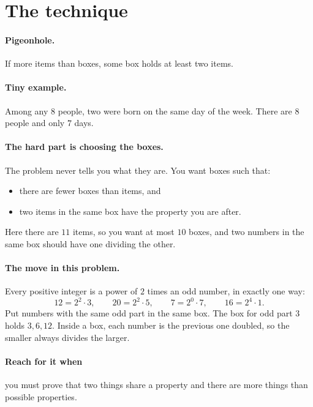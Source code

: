 \documentclass[11pt]{article}
\begin{document}

\section*{The technique}

\paragraph{Pigeonhole.} If more items than boxes, some box holds at least two items.

\paragraph{Tiny example.} Among any $8$ people, two were born on the same day of the week. There are $8$ people and only $7$ days.

\paragraph{The hard part is choosing the boxes.} The problem never tells you what they are. You want boxes such that:
\begin{itemize}
  \item there are fewer boxes than items, and
  \item two items in the same box have the property you are after.
\end{itemize}
Here there are $11$ items, so you want at most $10$ boxes, and two numbers in the same box should have one dividing the other.

\paragraph{The move in this problem.} Every positive integer is a power of $2$ times an odd number, in exactly one way:
\[ 12 = 2^2 \cdot 3, \qquad 20 = 2^2 \cdot 5, \qquad 7 = 2^0 \cdot 7, \qquad 16 = 2^4 \cdot 1. \]
Put numbers with the same odd part in the same box. The box for odd part $3$ holds $3, 6, 12$. Inside a box, each number is the previous one doubled, so the smaller always divides the larger.

\paragraph{Reach for it when} you must prove that two things share a property and there are more things than possible properties.
\end{document}
